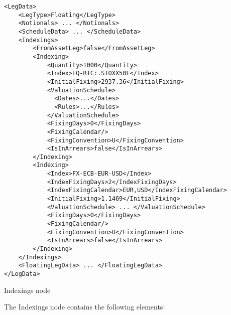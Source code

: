 \begin{listing}[H]
\begin{verbatim}
<LegData>
    <LegType>Floating</LegType>
    <Notionals> ... </Notionals>
    <ScheduleData> ... </ScheduleData>
    <Indexings>
        <FromAssetLeg>false</FromAssetLeg>
        <Indexing>
            <Quantity>1000</Quantity>
            <Index>EQ-RIC:.STOXX50E</Index>
            <InitialFixing>2937.36</InitialFixing>
            <ValuationSchedule>
              <Dates>...</Dates>
              <Rules>...</Rules>
            </ValuationSchedule>
            <FixingDays>0</FixingDays>
            <FixingCalendar/>
            <FixingConvention>U</FixingConvention>
            <IsInArrears>false</IsInArrears>
        </Indexing>
        <Indexing>
            <Index>FX-ECB-EUR-USD</Index>
            <IndexFixingDays>2</IndexFixingDays>
            <IndexFixingCalendar>EUR,USD</IndexFixingCalendar>
            <InitialFixing>1.1469</InitialFixing>
            <ValuationSchedule> ... </ValuationSchedule>
            <FixingDays>0</FixingDays>
            <FixingCalendar/>
            <FixingConvention>U</FixingConvention>
            <IsInArrears>false</IsInArrears>
        </Indexing>
    </Indexings>
    <FloatingLegData> ... </FloatingLegData>
</LegData>
\end{verbatim}
\caption{Indexings node}
\label{lst:indexings}
\end{listing}

The Indexings node contains the following elements:


